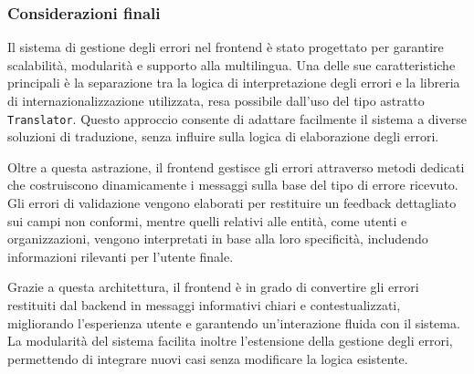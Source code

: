 \subsubsection{Considerazioni finali}
Il sistema di gestione degli errori nel frontend è stato progettato per garantire scalabilità, modularità e supporto alla multilingua. Una delle sue caratteristiche principali è la separazione tra la logica di interpretazione degli errori e la libreria di internazionalizzazione utilizzata, resa possibile dall’uso del tipo astratto \texttt{Translator}. Questo approccio consente di adattare facilmente il sistema a diverse soluzioni di traduzione, senza influire sulla logica di elaborazione degli errori.

Oltre a questa astrazione, il frontend gestisce gli errori attraverso metodi dedicati che costruiscono dinamicamente i messaggi sulla base del tipo di errore ricevuto. Gli errori di validazione vengono elaborati per restituire un feedback dettagliato sui campi non conformi, mentre quelli relativi alle entità, come utenti e organizzazioni, vengono interpretati in base alla loro specificità, includendo informazioni rilevanti per l’utente finale.

Grazie a questa architettura, il frontend è in grado di convertire gli errori restituiti dal backend in messaggi informativi chiari e contestualizzati, migliorando l’esperienza utente e garantendo un’interazione fluida con il sistema. La modularità del sistema facilita inoltre l’estensione della gestione degli errori, permettendo di integrare nuovi casi senza modificare la logica esistente.
